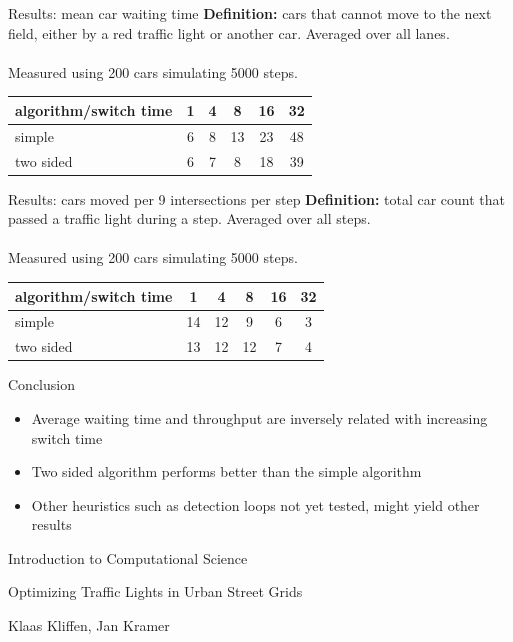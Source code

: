 \documentclass[11pt]{beamer}
\begin{document}
\begin{frame}{Results: mean car waiting time}
\textbf{Definition:} cars that cannot move to the next field, either by a 
red traffic light or another car. Averaged over all lanes.\\~\\
Measured using 200 cars simulating 5000 steps.

\begin{table}
\centering
\begin{tabular}{l|c|c|c|c|c}
algorithm/switch time & 1 & 4 & 8 & 16 & 32\\
\hline
simple & 6 & 8 & 13 & 23 & 48\\
two sided & 6 & 7 & 8 & 18 & 39\\
\end{tabular}
\end{table}
 
\end{frame}

\begin{frame}{Results: cars moved per 9 intersections per step}
\textbf{Definition:} total car count that passed a traffic light during a step.
Averaged over all steps.\\~\\
Measured using 200 cars simulating 5000 steps.
\begin{table}
\centering
\begin{tabular}{l|c|c|c|c|c}
algorithm/switch time & 1 & 4 & 8 & 16 & 32\\
\hline
simple & 14 & 12 & 9 & 6 & 3\\
two sided & 13 & 12 & 12 & 7 & 4\\
\end{tabular}
\end{table}
 
\end{frame}


\begin{frame}{Conclusion}

\begin{itemize}
 \item Average waiting time and throughput are inversely related with increasing switch time
 \item Two sided algorithm performs better than the simple algorithm
 \item Other heuristics such as detection loops not yet tested, might yield other results
\end{itemize}

    
\end{frame}

\begin{frame}{Introduction to Computational Science}
\begin{center}
{\large Optimizing Traffic Lights in Urban Street Grids}\\
\end{center}

\begin{center}
Klaas Kliffen, Jan Kramer
\end{center}

    
\end{frame}
\end{document}
